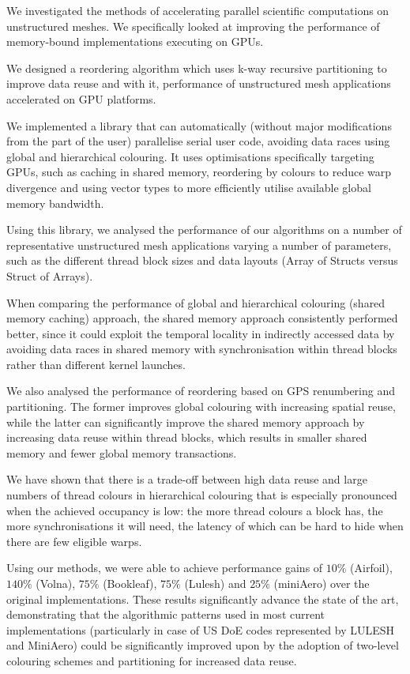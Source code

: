 We investigated the methods of accelerating parallel scientific computations on
unstructured meshes. We specifically looked at improving the performance of
memory-bound implementations executing on GPUs.

We designed a reordering algorithm which uses k-way recursive partitioning to
improve data reuse and with it, performance of unstructured mesh applications
accelerated on GPU platforms.

We implemented a library that can automatically (without major modifications
from the part of the user) parallelise serial user code, avoiding data races
using global and hierarchical colouring. It uses optimisations specifically
targeting GPUs, such as caching in shared memory, reordering by colours to
reduce warp divergence and using vector types to more efficiently utilise
available global memory bandwidth.

Using this library, we analysed the performance of our algorithms on a number of
representative unstructured mesh applications varying a number of parameters,
such as the different thread block sizes and data layouts (Array of Structs
versus Struct of Arrays).

When comparing the performance of global and hierarchical colouring (shared
memory caching) approach, the shared memory approach consistently performed
better, since it could exploit the temporal locality in indirectly accessed data
by avoiding data races in shared memory with synchronisation within thread
blocks rather than different kernel launches.

We also analysed the performance of reordering based on GPS renumbering and
partitioning. The former improves global colouring with increasing spatial
reuse, while the latter can significantly improve the shared memory approach by
increasing data reuse within thread blocks, which results in smaller shared
memory and fewer global memory transactions.

We have shown that there is a trade-off between high data reuse and large
numbers of thread colours in hierarchical colouring that is especially
pronounced when the achieved occupancy is low: the more thread colours a block
has, the more synchronisations it will need, the latency of which can be hard to
hide when there are few eligible warps.

Using our methods, we were able to achieve performance gains of $10\%$
(Airfoil), $140\%$ (Volna), $75\%$ (Bookleaf), $75\%$ (Lulesh) and $25\%$
(miniAero) over the original implementations. These results significantly
advance the state of the art, demonstrating that the algorithmic patterns used
in most current implementations (particularly in case of US DoE codes
represented by LULESH and MiniAero) could be significantly improved upon by the
adoption of two-level colouring schemes and partitioning for increased data
reuse.

